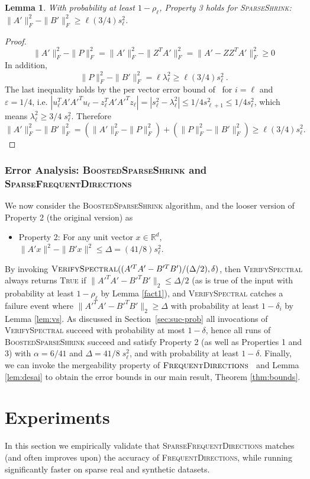 \documentclass[11pt]{article}
\newcommand{\R}{\mathbb{R}}
\newcommand{\eps}{\varepsilon}
\newcommand{\fd}{\textsc{FrequentDirections}\xspace}
\newcommand{\sfd}{\textsc{SparseFrequentDirections}\xspace}
\newcommand{\SSh}{\textsc{SparseShrink}\xspace}
\newcommand{\BSSh}{\textsc{BoostedSparseShrink}\xspace}
\newcommand{\vs}{\textsc{VerifySpectral}\xspace}
\newtheorem{lemma}{Lemma}[section]
\newcommand{\denselist}{\itemsep -2pt\parsep=-1pt\partopsep -2pt}
\begin{document}
\begin{lemma}
With probability at least $1-\rho_\ell$, Property 3 holds for \SSh: $\|A'\|_F^2 - \|B'\|_F^2 \geq  \ell (3/4) s_\ell^2$.  
\label{lem:prop3}
\end{lemma}
\begin{proof}\[
\|A'\|_F^2 - \|P\|_F^2 = \|A'\|_F^2 - \|Z^TA'\|_F^2 = \|A'-ZZ^TA'\|_F^2 \geq 0
\]
In addition, 
\[
\|P\|_F^2 - \|B'\|_F^2 = \ell \lambda_\ell^2 \geq \ell (3 / 4) s_\ell^2 \ .
\]
The last inequality holds by the per vector error bound of~\cite{musco2015stronger} for $i=\ell$ and $\eps = 1/4$, i.e. 
$|u_\ell^TA'A'^T u_\ell - z_\ell^TA'A'^T z_\ell | = |s_\ell^2 - \lambda_\ell^2| \leq 1/4 s_{\ell+1}^2 \leq 1/4 s_{\ell}^2$, which means $\lambda_\ell^2 \geq 3/4\; s_\ell^2$.
Therefore 
\[
\|A'\|_F^2 - \|B'\|_F^2 = (\|A'\|_F^2 - \|P\|_F^2) + (\|P\|_F^2 - \|B'\|_F^2) \geq \ell (3/4) s_{\ell}^2.  \]
\end{proof}



\subsubsection{Error Analysis: \BSSh and \sfd}
We now consider the \BSSh algorithm, and the looser version of Property 2 (the original version) as
\begin{itemize} \denselist
\item Property 2: For any unit vector $x\in\R^d$, $\|A'x\|^2 - \|B'x\|^2 \leq \Delta = (41/8) s_\ell^2$.  
\end{itemize}
By invoking $\vs((A'^TA' - B'^TB')/(\Delta/2), \delta)$, then \vs always returns \textsc{True} if 
$\|A'^TA' - B'^TB'\|_2 \leq \Delta/2$ (as is true of the input with probability at least $1-\rho_\ell$ by Lemma \ref{fact1}), and 
\vs catches a failure event where $\|A'^TA' - B'^TB'\|_2 \geq \Delta$ with probability at least $1-\delta_i$ by Lemma \ref{lem:vs}.  
As discussed in Section~\ref{sec:suc-prob} all invocations of \vs succeed with probability at most $1-\delta$, hence all runs of \BSSh succeed and satisfy Property 2 (as well as Properties 1 and 3) with $\alpha = 6/41$ and $\Delta = 41/8\; s_\ell^2$, and with probability at least $1-\delta$.
Finally, we can invoke the mergeability property of $\fd$~\cite{Lib12} and Lemma \ref{lem:desai} to obtain the error bounds in our main result, Theorem \ref{thm:bounds}.  




\section{Experiments}
\label{sec:exp}
In this section we empirically validate that \sfd matches (and often improves upon) the accuracy of \fd, while running significantly faster on sparse real and synthetic datasets.  
\end{document}
